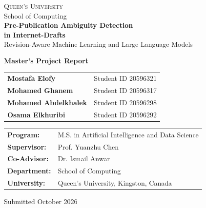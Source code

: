 \documentclass[12pt,a4paper,oneside]{report}
\begin{document}
\hypersetup{pageanchor=false}
\begin{titlepage}
\centering
\vspace*{1.3cm}
{\Large \textsc{Queen's University}\\[0.35cm]}
{\large School of Computing\\[1.5cm]}
{\huge\bfseries Pre-Publication Ambiguity Detection\\[0.2cm]
in Internet-Drafts\\[0.45cm]}
{\Large Revision-Aware Machine Learning and Large Language Models\\[1.5cm]}

{\Large\bfseries Master's Project Report\\[1.2cm]}

\begin{tabular}{ll}
\textbf{Mostafa Elofy} & Student ID 20596321 \\
\textbf{Mohamed Ghanem} & Student ID 20596317 \\
\textbf{Mohamed Abdelkhalek} & Student ID 20596298 \\
\textbf{Osama Elkhuribi} & Student ID 20596292 \\
\end{tabular}

\vfill
\begin{tabular}{ll}
\textbf{Program:} & M.S. in Artificial Intelligence and Data Science \\
\textbf{Supervisor:} & Prof. Yuanzhu Chen \\
\textbf{Co-Advisor:} & Dr. Ismail Anwar \\
\textbf{Department:} & School of Computing \\
\textbf{University:} & Queen's University, Kingston, Canada \\
\end{tabular}

\vfill
{\large Submitted October 2026}
\end{titlepage}

\hypersetup{pageanchor=true}
\end{document}
